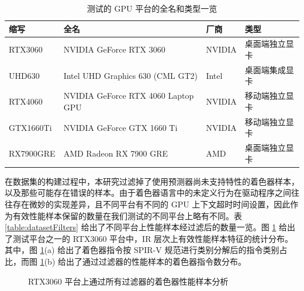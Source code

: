 \begin{table}[h]
    \centering
    \caption{测试的 GPU 平台的全名和类型一览}
    \label{table:envInfo}
    \begin{tabular}{llll}
    \toprule
        \textbf{缩写} & \textbf{全名} & \textbf{厂商} & \textbf{类型} \\ 
    \midrule
        RTX3060 & NVIDIA GeForce RTX 3060 & NVIDIA & 桌面端独立显卡 \\ 
        UHD630 & Intel UHD Graphics 630 (CML GT2) & Intel & 桌面端集成显卡 \\ 
        RTX4060 & NVIDIA GeForce RTX 4060 Laptop GPU & NVIDIA & 移动端独立显卡 \\ 
        GTX1660Ti & NVIDIA GeForce GTX 1660 Ti & NVIDIA & 移动端独立显卡 \\ 
        RX7900GRE & AMD Radeon RX 7900 GRE & AMD & 桌面端独立显卡 \\ 
    \bottomrule
    \end{tabular}
\end{table}

在数据集的构建过程中，本研究过滤掉了使用预测器尚未支持特性的着色器样本，以及那些可能存在错误的样本。由于着色器语言中的未定义行为在驱动程序之间往往存在微妙的实现差异，且不同平台有不同的 GPU 上下文超时时间设置，因此作为有效性能样本保留的数量在我们测试的不同平台上略有不同。表 \ref{table:datasetFilters} 给出了不同平台上性能样本经过滤后的数量一览。图 \ref{fig:instStat} 给出了测试平台之一的 RTX3060 平台中，IR 层次上有效性能样本特征的统计分布。其中，图 \ref{fig:instStat}(a) 给出了着色器指令按 SPIR-V 规范进行类别分解后的指令类别占比，而图 \ref{fig:instStat}(b) 给出了通过过滤器的性能样本的着色器指令数分布。 

\begin{figure}[h]
  \centering
      \centering
      \qquad
  \caption{RTX3060 平台上通过所有过滤器的着色器性能样本分析}
  \label{fig:instStat}
\end{figure}

